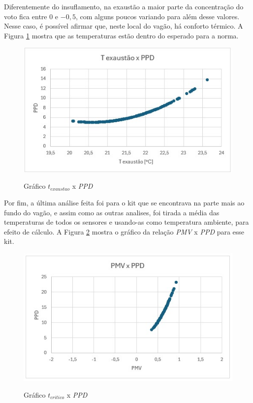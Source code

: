 \documentclass[acronym,symbols,table]{fei}
\begin{document}
Diferentemente do insuflamento, na exaustão a maior parte da concentração do voto fica entre $0$ e $-0,5$, com alguns poucos variando para além desse valores. Nesse caso, é possível afirmar que, neste local do vagão, há conforto térmico. A Figura \ref{fig:texaustao-ppd} mostra que as temperaturas estão dentro do esperado para a norma.

\begin{figure}[!htb]
    \centering
    \caption{Gráfico $t_{exaustao}$ x \textit{PPD}}
    \includegraphics[width=0.8\linewidth]{Imagens/texaustao-ppd.jpeg}
    \label{fig:texaustao-ppd}
\end{figure}


Por fim, a última análise feita foi para o kit que se encontrava na parte mais ao fundo do vagão, e assim como as outras analises, foi tirada a média das temperaturas de todos os sensores e usando-as como temperatura ambiente, para efeito de cálculo. A Figura \ref{fig:pmv-ppd-critico} mostra o gráfico da relação \textit{PMV} x \textit{PPD} para esse kit. 

\begin{figure}[!htb]
    \centering
    \caption{Gráfico $t_{critico}$ x \textit{PPD}}
    \includegraphics[width=0.8\linewidth]{Imagens/pmv-ppd-critico.jpeg}
    \label{fig:pmv-ppd-critico}
\end{figure}
\end{document}
